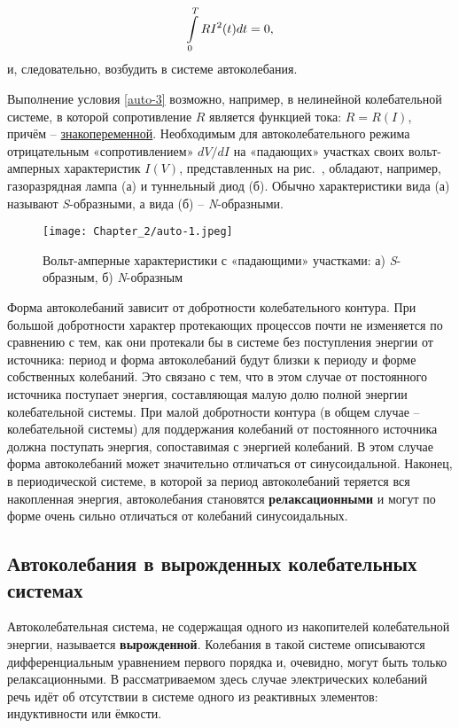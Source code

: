 \begin{equation}
	\eqmark{auto-3}
	\int\limits_{0}^{T}{R{{I}^{2}}(t)dt}=0,
\end{equation}
и, следовательно, возбудить в системе автоколебания.

Выполнение условия \eqref{auto-3} возможно, например, в {нелинейной} колебательной системе, в которой сопротивление $R$ является функцией тока: $R=R(I)$, причём -- \underline{знакопеременной}. Необходимым для
автоколебательного режима отрицательным «сопротивлением» ${dV}/{dI}$ на «падающих» участках своих вольт-амперных характеристик $I(V)$, представленных на рис.~, обладают, например, газоразрядная лампа (а) и туннельный диод (б). Обычно характеристики вида (а) называют \emph{S}-образными, а вида (б) -- \emph{N}-образными.

\begin{figure}
	\centering
	\texttt{[image: Chapter\_2/auto-1.jpeg]}
	\caption{Вольт-амперные характеристики с «падающими» участками:	а) \emph{S}-образным, б) \emph{N}-образным}
\end{figure}


Форма автоколебаний зависит от добротности колебательного контура. При большой добротности характер протекающих процессов почти не изменяется по сравнению с тем, как они протекали бы в системе без поступления
энергии от источника: период и форма автоколебаний будут близки к периоду и форме собственных колебаний. Это связано с тем, что в этом случае от постоянного источника поступает энергия, составляющая малую
долю полной энергии колебательной системы. При малой добротности контура (в общем случае -- колебательной системы) для поддержания колебаний от постоянного источника должна поступать энергия, сопоставимая с энергией колебаний. В этом случае форма автоколебаний может значительно отличаться от синусоидальной. Наконец, в периодической системе, в которой за период автоколебаний теряется вся накопленная энергия, автоколебания становятся \textbf{релаксационными} и могут по форме очень сильно отличаться от колебаний синусоидальных.

\subsection{Автоколебания в вырожденных колебательных системах}
Автоколебательная система, не содержащая одного из накопителей колебательной энергии, называется \textbf{вырожденной}. Колебания в такой системе описываются дифференциальным уравнением первого порядка и, очевидно, могут быть только релаксационными. В рассматриваемом здесь случае электрических колебаний речь идёт об отсутствии в системе одного из реактивных элементов: индуктивности или ёмкости.

